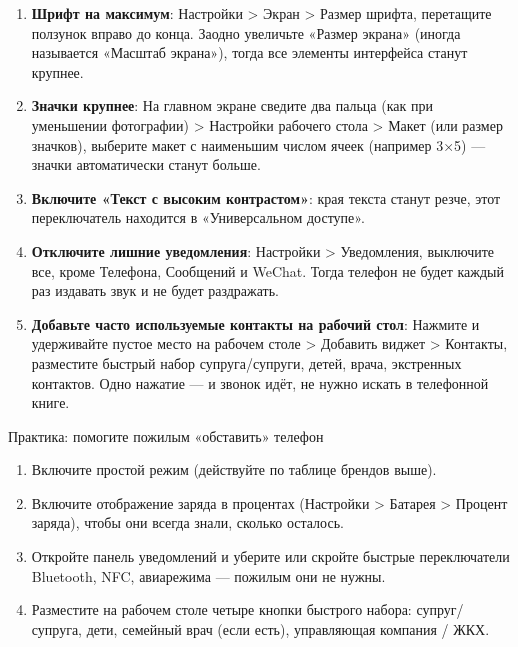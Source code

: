 \begin{enumerate}
  \item \textbf{Шрифт на максимум}: Настройки > Экран > Размер шрифта, перетащите ползунок вправо до конца. Заодно увеличьте «Размер экрана» (иногда называется «Масштаб экрана»), тогда все элементы интерфейса станут крупнее.
  \item \textbf{Значки крупнее}: На главном экране сведите два пальца (как при уменьшении фотографии) > Настройки рабочего стола > Макет (или размер значков), выберите макет с наименьшим числом ячеек (например 3×5) — значки автоматически станут больше.
  \item \textbf{Включите «Текст с высоким контрастом»}: края текста станут резче, этот переключатель находится в «Универсальном доступе».
  \item \textbf{Отключите лишние уведомления}: Настройки > Уведомления, выключите все, кроме Телефона, Сообщений и WeChat. Тогда телефон не будет каждый раз издавать звук и не будет раздражать.
  \item \textbf{Добавьте часто используемые контакты на рабочий стол}: Нажмите и удерживайте пустое место на рабочем столе > Добавить виджет > Контакты, разместите быстрый набор супруга/супруги, детей, врача, экстренных контактов. Одно нажатие — и звонок идёт, не нужно искать в телефонной книге.
\end{enumerate}

\begin{tcbpractice}{Практика: помогите пожилым «обставить» телефон}
\begin{enumerate}
  \item Включите простой режим (действуйте по таблице брендов выше).
  \item Включите отображение заряда в процентах (Настройки > Батарея > Процент заряда), чтобы они всегда знали, сколько осталось.
  \item Откройте панель уведомлений и уберите или скройте быстрые переключатели Bluetooth, NFC, авиарежима — пожилым они не нужны.
  \item Разместите на рабочем столе четыре кнопки быстрого набора: супруг/супруга, дети, семейный врач (если есть), управляющая компания / ЖКХ.
\end{enumerate}

\end{tcbpractice}


